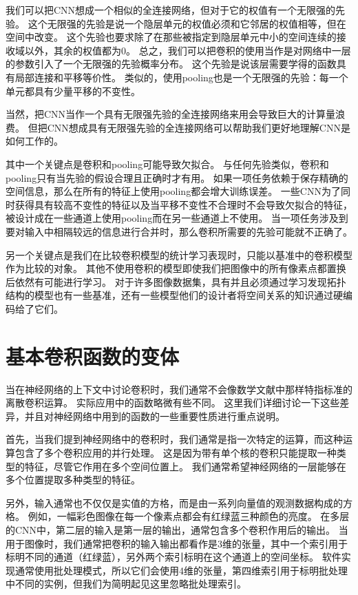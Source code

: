 我们可以把\gls{CNN}想成一个相似的全连接网络，但对于它的权值有一个无限强的先验。
这个无限强的先验是说一个隐层单元的权值必须和它邻居的权值相等，但在空间中改变。
这个先验也要求除了在那些被指定到隐层单元中小的空间连续的接收域以外，其余的权值都为0。
总之，我们可以把卷积的使用当作是对网络中一层的参数引入了一个无限强的先验概率分布。
这个先验是说该层需要学得的函数具有局部连接和平移等价性。
类似的，使用\gls{pooling}也是一个无限强的先验：每一个单元都具有少量平移的不变性。

当然，把\gls{CNN}当作一个具有无限强先验的全连接网络来用会导致巨大的计算量浪费。
但把\gls{CNN}想成具有无限强先验的全连接网络可以帮助我们更好地理解\gls{CNN}是如何工作的。

其中一个关键点是卷积和\gls{pooling}可能导致欠拟合。
与任何先验类似，卷积和\gls{pooling}只有当先验的假设合理且正确时才有用。
如果一项任务依赖于保存精确的空间信息，那么在所有的特征上使用\gls{pooling}都会增大训练误差。
一些\gls{CNN}\citep{Szegedy-et-al-arxiv2014}为了同时获得具有较高不变性的特征以及当平移不变性不合理时不会导致欠拟合的特征，被设计成在一些通道上使用\gls{pooling}而在另一些通道上不使用。
当一项任务涉及到要对输入中相隔较远的信息进行合并时，那么卷积所需要的先验可能就不正确了。

另一个关键点是我们在比较卷积模型的统计学习表现时，只能以基准中的卷积模型作为比较的对象。
其他不使用卷积的模型即使我们把图像中的所有像素点都置换后依然有可能进行学习。
对于许多图像数据集，具有并且必须通过学习发现拓扑结构的模型也有一些基准，还有一些模型他们的设计者将空间关系的知识通过硬编码给了它们。


\section{基本卷积函数的变体}
\label{sec:variants_of_the_basic_convolution_function}

当在神经网络的上下文中讨论卷积时，我们通常不会像数学文献中那样特指标准的离散卷积运算。
实际应用中的函数略微有些不同。
这里我们详细讨论一下这些差异，并且对神经网络中用到的函数的一些重要性质进行重点说明。

首先，当我们提到神经网络中的卷积时，我们通常是指一次特定的运算，而这种运算包含了多个卷积应用的并行处理。
这是因为带有单个核的卷积只能提取一种类型的特征，尽管它作用在多个空间位置上。
我们通常希望神经网络的一层能够在多个位置提取多种类型的特征。

另外，输入通常也不仅仅是实值的方格，而是由一系列向量值的观测数据构成的方格。
例如，一幅彩色图像在每一个像素点都会有红绿蓝三种颜色的亮度。
在多层的\gls{CNN}中，第二层的输入是第一层的输出，通常包含多个卷积作用后的输出。
当用于图像时，我们通常把卷积的输入输出都看作是3维的张量，其中一个索引用于标明不同的通道（红绿蓝），另外两个索引标明在这个通道上的空间坐标。
软件实现通常使用批处理模式，所以它们会使用4维的张量，第四维索引用于标明批处理中不同的实例，但我们为简明起见这里忽略批处理索引。

